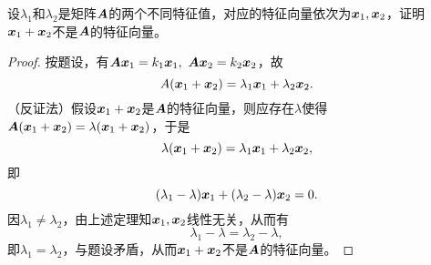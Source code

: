 \begin{li}
设$\lambda_1$和$\lambda_2$是矩阵$\A$的两个不同特征值，对应的特征向量依次为$\xx_1,\xx_2$，证明$\xx_1+\xx_2$不是$\A$的特征向量。
\end{li}
\begin{proof}
  按题设，有$\A\xx_1=k_1\xx_1,~\A\xx_2=k_2\xx_2$，故
  $$
  A(\xx_1+\xx_2)=\lambda_1\xx_1+\lambda_2\xx_2.
  $$
  （反证法）假设$\xx_1+\xx_2$是$\A$的特征向量，则应存在$\lambda$使得$\A(\xx_1+\xx_2)=\lambda(\xx_1+\xx_2)$，于是
  $$
  \lambda(\xx_1+\xx_2)=\lambda_1\xx_1+\lambda_2\xx_2,
  $$
  即
  $$
  (\lambda_1-\lambda)\xx_1+(\lambda_2-\lambda)\xx_2=0.
  $$
  因$\lambda_1\ne\lambda_2$，由上述定理知$\xx_1,\xx_2$线性无关，从而有
  $$
  \lambda_1-\lambda=\lambda_2-\lambda,
  $$
  即$\lambda_1=\lambda_2$，与题设矛盾，从而$\xx_1+\xx_2$不是$\A$的特征向量。
\end{proof}